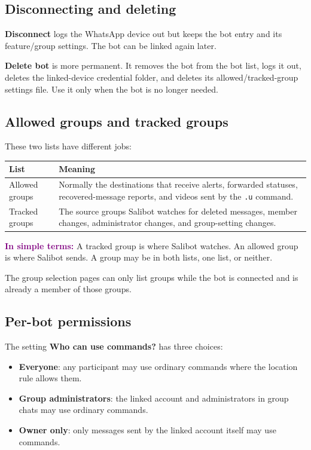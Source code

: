 \documentclass[11pt,a4paper]{article}
\newcommand{\plain}[1]{\textcolor{purple}{\textbf{In simple terms:}} #1}
\begin{document}
\subsection{Disconnecting and deleting}

\textbf{Disconnect} logs the WhatsApp device out but keeps the bot entry and its feature/group settings. The bot can be linked again later.

\textbf{Delete bot} is more permanent. It removes the bot from the bot list, logs it out, deletes the linked-device credential folder, and deletes its allowed/tracked-group settings file. Use it only when the bot is no longer needed.

\subsection{Allowed groups and tracked groups}

These two lists have different jobs:

\begin{longtable}{p{}p{}}
\toprule
\textbf{List} & \textbf{Meaning}\\
\midrule
Allowed groups & Normally the destinations that receive alerts, forwarded statuses, recovered-message reports, and videos sent by the \texttt{.u} command.\\
Tracked groups & The source groups Salibot watches for deleted messages, member changes, administrator changes, and group-setting changes.\\
\bottomrule
\end{longtable}

\plain{A tracked group is where Salibot watches. An allowed group is where Salibot sends. A group may be in both lists, one list, or neither.}

The group selection pages can only list groups while the bot is connected and is already a member of those groups.

\subsection{Per-bot permissions}

The setting \textbf{Who can use commands?} has three choices:

\begin{itemize}
  \item \textbf{Everyone}: any participant may use ordinary commands where the location rule allows them.
  \item \textbf{Group administrators}: the linked account and administrators in group chats may use ordinary commands.
  \item \textbf{Owner only}: only messages sent by the linked account itself may use commands.
\end{itemize}
\end{document}
